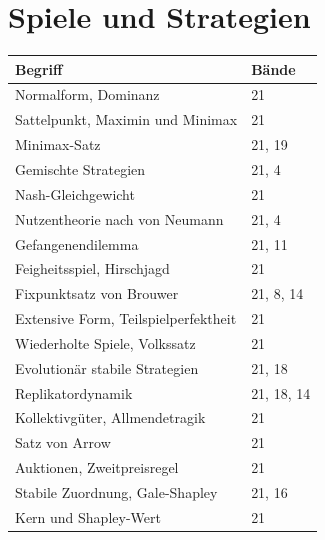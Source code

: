 \section*{Spiele und Strategien}
\nopagebreak
{\small\renewcommand{\arraystretch}{1.32}
\begin{longtable}{@{}P{5.6cm}P{2.8cm}@{}}
\toprule
\textbf{Begriff} & \textbf{Bände}\\
\midrule
\endhead
Normalform, Dominanz & 21\\
Sattelpunkt, Maximin und Minimax & 21\\
Minimax-Satz & 21, 19\\
Gemischte Strategien & 21, 4\\
Nash-Gleichgewicht & 21\\
Nutzentheorie nach von Neumann & 21, 4\\
Gefangenendilemma & 21, 11\\
Feigheitsspiel, Hirschjagd & 21\\
Fixpunktsatz von Brouwer & 21, 8, 14\\
Extensive Form, Teilspielperfektheit & 21\\
Wiederholte Spiele, Volkssatz & 21\\
Evolutionär stabile Strategien & 21, 18\\
Replikatordynamik & 21, 18, 14\\
Kollektivgüter, Allmendetragik & 21\\
Satz von Arrow & 21\\
Auktionen, Zweitpreisregel & 21\\
Stabile Zuordnung, Gale-Shapley & 21, 16\\
Kern und Shapley-Wert & 21\\
\bottomrule
\end{longtable}}

